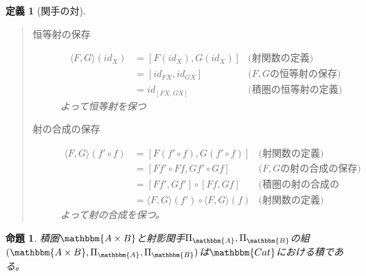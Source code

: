 \documentclass[uplatex,dvipdfmx]{jsarticle}
\newcommand{\cat}[1]{\mathbbm{#1}}
\newcommand{\tuple}[1]{\langle #1\rangle}
\newcommand{\pcobj}[1]{[#1]}
\newtheorem{prop}{命題}[section]
\newtheorem{define}{定義}[section]
\numberwithin{proof}{subsection}
\numberwithin{prop}{subsection}
\numberwithin{define}{subsection}
\begin{document}
\begin{define}[関手の対]
\begin{quote}
\begin{description}
				\begin{center}
				\end{center}
				\item[恒等射の保存]
				\begin{align*}
					\tuple{F,G}(id_X)&=\pcobj{F(id_X),G(id_X)}&\text{(射関数の定義)}\\
					&=\pcobj{id_{FX},id_{GX}}&\text{($F,G$の恒等射の保存)}\\
					&=id_{\pcobj{FX,GX}}&\text{(積圏の恒等射の定義)}
				\end{align*}
			よって恒等射を保つ
				\item[射の合成の保存]
				\begin{align*}
					\tuple{F,G}(f'\circ f)&=\pcobj{F(f'\circ f),G(f'\circ f)}&\text{(射関数の定義)}\\
					&=\pcobj{Ff'\circ Ff, Gf'\circ Gf}&\text{($F,G$の射の合成の保存)}\\
					&=\pcobj{Ff',Gf'}\circ\pcobj{Ff,Gf}&\text{(積圏の射の合成の定義)}\\
					&=\tuple{F,G}(f')\circ\tuple{F,G}(f)&\text{(射関数の定義)}
				\end{align*}
			よって射の合成を保つ。
			\end{description}
		\end{quote}
	\end{define}
	\begin{prop}
		積圏$\cat{A\times B}$と射影関手$\Pi_\cat{A},\Pi_\cat{B}$の組$(\cat{A\times B},\Pi_\cat{A},\Pi_\cat{B})$は$\cat{Cat}$における積である。
	\end{prop}
\end{document}
